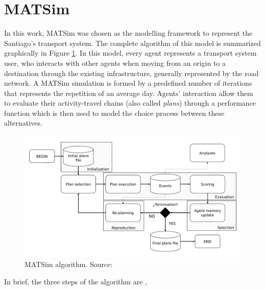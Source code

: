 \documentclass[Journal,letterpaper]{ascelike-new}
\begin{document}
\section{MATSim}
\label{sec:matsim}
In this work, MATSim was chosen as the modelling framework to represent the Santiago's transport system. The complete algorithm of this model is summarized graphically in Figure \ref{fig:matsim_algorithm}. 
In this model, every agent represents a transport system user, who interacts with other agents when moving from an origin to a destination through the existing infrastructure, generally represented by the road network. A MATSim simulation is formed by a predefined number of iterations that represents the repetition of an average day. Agents' interaction allow them to evaluate their activity-travel chains (also called \emph{plans}) through a performance function which is then used to model the choice process between these alternatives.
\begin{figure}
    \centering
    \includegraphics[scale=0.4]{images/0_algoritmo.pdf}
    \caption{MATSim algorithm. Source: \protect\cite{meister2011contribution}}
    \label{fig:matsim_algorithm}
\end{figure}
In brief, the three steps of the algorithm are \citep{KickhoeferEtAl2016},
\end{document}
